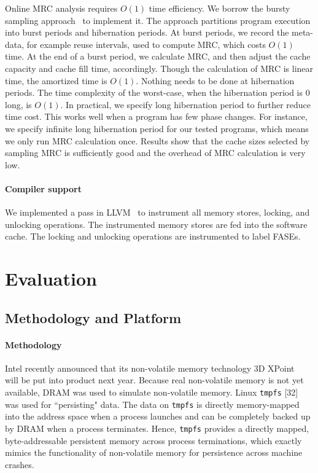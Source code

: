 \documentclass[preprint,nocopyrightspace,10pt]{sigplanconf}
\begin{document}
Online MRC analysis requires $O(1)$ time efficiency. We borrow the bursty sampling 
approach~\cite{ArnoldR:PLDI01,ChilimbiH:PLDI02} to implement it. The approach partitions 
program execution into burst periods and hibernation periods.  At burst periods, we record the 
meta-data, for example reuse intervals, used to compute MRC, which costs $O(1)$ time. 
At the end of a burst period, we calculate MRC, and then adjust the cache capacity 
and cache fill time, accordingly. Though the calculation of MRC is linear time, the amortized 
time is $O(1)$. Nothing needs to be done at hibernation periods. The time complexity of the 
worst-case, when the hibernation period is 0 long, is $O(1)$. In practical, we specify long 
hibernation period to further reduce time cost. This works well when a program has few 
phase changes. For instance, we specify infinite long hibernation period for our tested 
programs, which means we only run MRC calculation once. Results show that the cache 
sizes selected by sampling MRC is sufficiently good and the overhead of MRC calculation 
is very low. 

\paragraph{Compiler support} 
We implemented a pass in LLVM~\cite{LattnerA:PLDI05} to instrument all memory 
stores, locking, and unlocking operations. The instrumented memory stores are fed
into the software cache. The locking and unlocking operations are instrumented to
label FASEs.

\section{Evaluation}

\subsection{Methodology and Platform}

\paragraph{Methodology}

Intel recently announced that its non-volatile memory technology 3D XPoint~\cite{3DXPoint:2014} will 
be put into product next year. Because real non-volatile memory is not yet available, 
DRAM was used to simulate non-volatile memory. Linux \texttt{tmpfs} [32] was used 
for ``persisting" data. The data on \texttt{tmpfs} is directly memory-mapped into the 
address space when a process launches and can be completely backed up by DRAM 
when a process terminates. Hence, \texttt{tmpfs} provides a directly mapped, 
byte-addressable persistent memory across process terminations, which exactly 
mimics the functionality of non-volatile memory for persistence across machine crashes.
\end{document}
